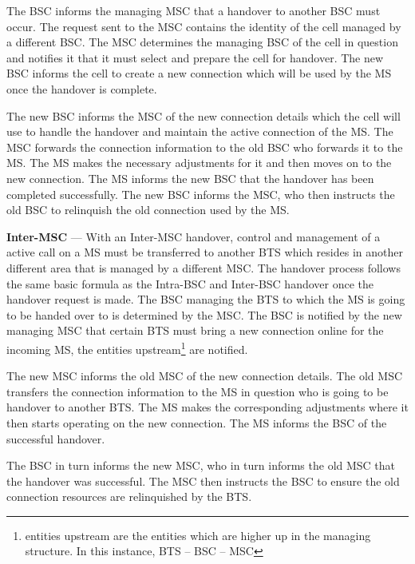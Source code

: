 \begin{description}
The BSC informs the managing MSC that a handover to another BSC must occur. The request sent to the MSC contains the identity of the cell managed by a different BSC. The MSC determines the managing BSC of the cell in question and notifies it that it must select and prepare the cell for handover. The new BSC informs the cell to create a new connection which will be used by the MS once the handover is complete\cite{wirelesstelcoMullet,GSMArchitectureProtocolsServices}.

The new BSC informs the MSC of the new connection details which the cell will use to handle the handover and maintain the active connection of the MS. The MSC forwards the connection information to the old BSC who forwards it to the MS. The MS makes the necessary adjustments for it and then moves on to the new connection. The MS informs the new BSC that the handover has been completed successfully. The new BSC informs the MSC, who then instructs the old BSC to relinquish the old connection used by the MS\cite{wirelesstelcoMullet,GSMArchitectureProtocolsServices}.
\item{\textbf{Inter-MSC}} --- With an Inter-MSC handover, control and management of a active call on a MS must be transferred to another BTS which resides in another different area that is managed by a different MSC. The handover process follows the same basic formula as the Intra-BSC and Inter-BSC handover once the handover request is made\cite{wirelesstelcoMullet,GSMArchitectureProtocolsServices}.
The BSC managing the BTS to which the MS is going to be handed over to is determined by the MSC. The BSC is notified by the new managing MSC that certain BTS must bring a new connection online for the incoming MS, the entities upstream\footnote{entities upstream are the entities which are higher up in the managing structure. In this instance, BTS -- BSC -- MSC} are notified\cite{wirelesstelcoMullet,GSMArchitectureProtocolsServices}.

The new MSC informs the old MSC of the new connection details. The old MSC transfers the connection information to the MS in question who is going to be handover to another BTS. The MS makes the corresponding adjustments where it then starts operating on the new connection. The MS informs the BSC of the successful handover\cite{wirelesstelcoMullet,GSMArchitectureProtocolsServices}. 

The BSC in turn informs the new MSC, who in turn informs the old MSC that the handover was successful. The MSC then instructs the BSC to ensure the old connection resources are relinquished by the BTS.
\end{description}


